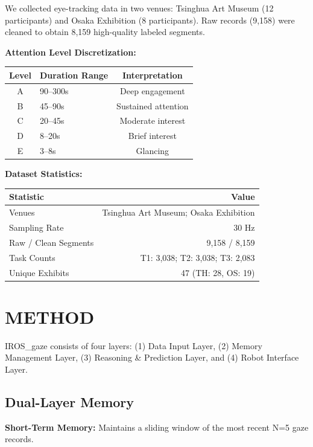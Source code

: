 \documentclass{article}
\begin{document}
We collected eye-tracking data in two venues: Tsinghua Art Museum (12 participants) and Osaka Exhibition (8 participants). Raw records (9,158) were cleaned to obtain 8,159 high-quality labeled segments.

\textbf{Attention Level Discretization:}

\begin{center}
\begin{tabular}{clc}
\hline
Level & Duration Range & Interpretation \\
\hline
A & 90--300s & Deep engagement \\
B & 45--90s & Sustained attention \\
C & 20--45s & Moderate interest \\
D & 8--20s & Brief interest \\
E & 3--8s & Glancing \\
\hline
\end{tabular}
\end{center}

\textbf{Dataset Statistics:}

\begin{center}
\begin{tabular}{lr}
\hline
Statistic & Value \\
\hline
Venues & Tsinghua Art Museum; Osaka Exhibition \\
Sampling Rate & 30 Hz \\
Raw / Clean Segments & 9,158 / 8,159 \\
Task Counts & T1: 3,038; T2: 3,038; T3: 2,083 \\
Unique Exhibits & 47 (TH: 28, OS: 19) \\
\hline
\end{tabular}
\end{center}

\section{METHOD}

IROS\_gaze consists of four layers: (1) Data Input Layer, (2) Memory Management Layer, (3) Reasoning \& Prediction Layer, and (4) Robot Interface Layer.

\subsection{Dual-Layer Memory}

\textbf{Short-Term Memory:} Maintains a sliding window of the most recent N=5 gaze records.
\end{document}
